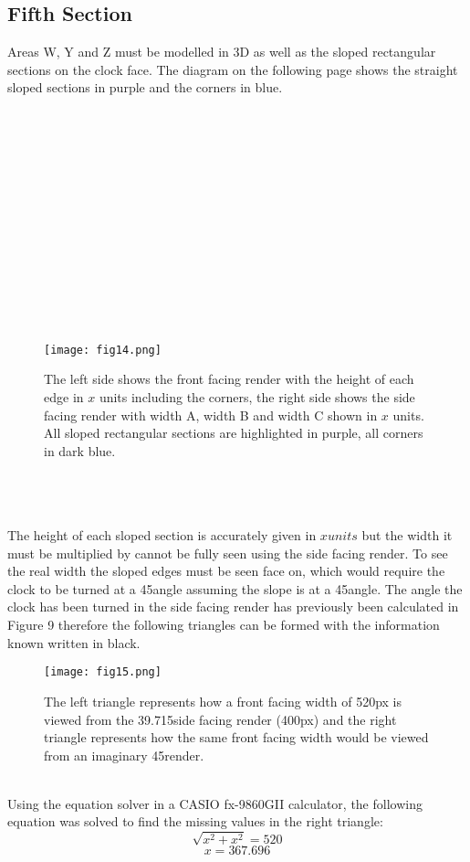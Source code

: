 \documentclass[a4paper,12pt]{article}
\begin{document}
\subsection{Fifth Section}
Areas W, Y and Z must be modelled in 3D as well as the sloped rectangular sections on the clock face. The diagram on the following page shows the straight sloped sections in purple and the corners in blue.\\\\\\\\\\\\\\\\\\\\\\\\\\\\
\begin{figure}[h!]
\centering
\texttt{[image: fig14.png]}
\caption{The left side shows the front facing render with the height of each edge in $x$ units including the corners, the right side shows the side facing render with width A, width B and width C shown in $x$ units. All sloped rectangular sections are highlighted in purple, all corners in dark blue.}
\label{fig:clock14}
\end{figure}
\\\\\\The height of each sloped section is accurately given in $x units$ but the width it must be multiplied by cannot be fully seen using the side facing render. To see the real width the sloped edges must be seen face on, which would require the clock to be turned at a 45\degree \:angle assuming the slope is at a 45\degree \:angle. The angle the clock has been turned in the side facing render has previously been calculated in Figure 9 therefore the following triangles can be formed with the information known written in black.
\begin{figure}[h!]
\centering
\texttt{[image: fig15.png]}
\caption{The left triangle represents how a front facing width of 520px is viewed from the 39.715\degree \:side facing render (400px) and the right triangle represents how the same front facing width would be viewed from an imaginary 45\degree \:render.}
\label{fig:clock15}
\end{figure}
\\Using the equation solver in a CASIO fx-9860GII calculator, the following equation was solved to find the missing values in the right triangle: $$\sqrt{x^2+x^2}=520$$ $$x=367.696$$
\end{document}
